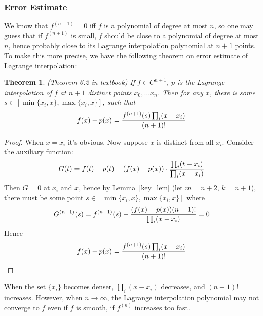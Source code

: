 \documentclass{article} %
\theoremstyle{break}
\newtheorem{thm}[definition]{Theorem}
\begin{document}
  \subsubsection{Error Estimate}
  
  We know that $f^{(n+1)}=0$ iff $f$ is a polynomial of degree at most $n$, so one may guess that if $f^{(n+1)}$ is small, $f$ should be close to a polynomial of degree at most $n$, hence probably close to its Lagrange interpolation polynomial at $n+1$ points. To make this more precise, we have the following theorem on error estimate of Lagrange interpolation:
\begin{thm}\label{err_lag} (Theorem 6.2 in textbook) If $f\in C^{n+1}$, $p$ is the Lagrange interpolation of $f$ at $n+1$ distinct points $x_0,\dots x_n$. Then for any $x$, there is some $s\in[\min\{x_i, x\}, \max\{x_i, x\}]$, such that
  \[f(x)-p(x)={f^{(n+1)}(s)\prod_i(x-x_i)\over (n+1)!}\]
\end{thm}


 \begin{proof} When $x=x_i$ it's obvious. Now suppose $x$ is distinct from all $x_i$. Consider the auxiliary function:
  \[G(t)=f(t)-p(t)-(f(x)-p(x))\cdot{\prod_i(t-x_i)\over \prod_i(x-x_i)}\]
  Then $G=0$ at $x_i$ and $x$, hence by Lemma~\ref{key_lem} (let $m=n+2$, $k=n+1$), there must be some point $s\in[\min\{x_i, x\}, \max\{x_i, x\}]$ where
  \[G^{(n+1)}(s)=f^{(n+1)}(s)-{(f(x)-p(x))(n+1)!\over \prod_i(x-x_i)}=0\]
  Hence
  \[f(x)-p(x)={f^{(n+1)}(s)\prod_i(x-x_i)\over (n+1)!}\]
\end{proof}


When the set $\{x_i\}$ becomes denser, $\prod_i(x-x_i)$ decreases, and $(n+1)!$ increases. However, when $n\rightarrow \infty$, the Lagrange interpolation polynomial may not converge to $f$ even if $f$ is smooth, if $f^{(n)}$ increases too fast.
\end{document}
